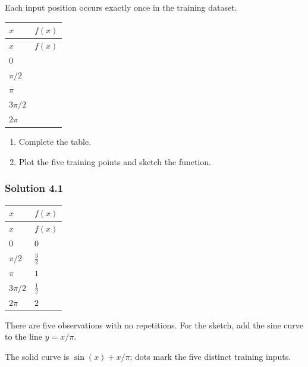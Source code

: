 \documentclass[10pt]{article}
\begin{document}
Each input position occurs exactly once in the training dataset.

\begingroup
\small
\setlength{\tabcolsep}{4pt}
\begin{longtable}{l|l}
$x$ & $f(x)$ \\
\hline
\endfirsthead
$x$ & $f(x)$ \\
\hline
\endhead
$0$ & $\phantom{0}$ \\[3pt]
$\pi/2$ & $\phantom{0}$ \\[3pt]
$\pi$ & $\phantom{0}$ \\[3pt]
$3\pi/2$ & $\phantom{0}$ \\[3pt]
$2\pi$ & $\phantom{0}$ \\[3pt]
\end{longtable}
\endgroup
\begin{enumerate}
\item
Complete the table.

\item
Plot the five training points and sketch the function.

\end{enumerate}
\begingroup\color{red}

\subsubsection*{Solution 4.1}
\begingroup
\small
\setlength{\tabcolsep}{4pt}
\begin{longtable}{l|l}
$x$ & $f(x)$ \\
\hline
\endfirsthead
$x$ & $f(x)$ \\
\hline
\endhead
$0$ & $0$ \\[1.5pt]
$\pi/2$ & $\frac{3}{2}$ \\[1.5pt]
$\pi$ & $1$ \\[1.5pt]
$3\pi/2$ & $\frac{1}{2}$ \\[1.5pt]
$2\pi$ & $2$ \\[1.5pt]
\end{longtable}
\endgroup
There are five observations with no repetitions. For the sketch, add the
sine curve to the line $y=x/\pi$.


The solid curve is $\sin(x)+x/\pi$; dots mark the five distinct training inputs.
\begin{center}
\end{center}
\par\endgroup
\end{document}

